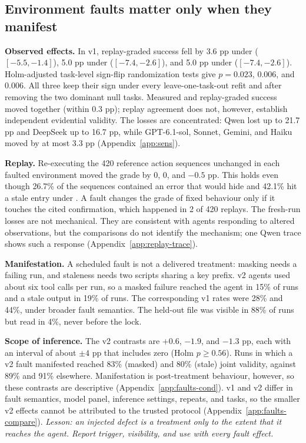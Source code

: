 \subsection{Environment faults matter only when they manifest}
\label{sec:env}
\textbf{Observed effects.} In v1, replay-graded success fell by 3.6 pp under
 ($[-5.5,-1.4]$), 5.0 pp under  ($[-7.4,-2.6]$), and
5.0 pp under  ($[-7.4,-2.6]$).
Holm-adjusted task-level sign-flip randomization tests give $p=0.023$,
$0.006$, and $0.006$. All three keep their sign under every leave-one-task-out
refit and after removing the two dominant null tasks. Measured and replay-graded success
moved together (within 0.3 pp); replay agreement does not, however,
establish independent evidential validity.
The losses are concentrated: Qwen lost up to 21.7 pp and DeepSeek up to
16.7 pp, while GPT-6.1-sol, Sonnet, Gemini, and Haiku moved by at most 3.3 pp
(Appendix~\ref{app:sens}).

\textbf{Replay.} Re-executing the 420 reference action sequences unchanged in
each faulted environment moved the grade by 0, 0, and $-0.5$ pp. This holds
even though 26.7\% of the sequences contained an error that 
would hide and 42.1\% hit a stale entry under . A fault changes the
grade of fixed behaviour only if it touches the cited confirmation, which
happened in 2 of 420 replays. The fresh-run losses are not mechanical. They are consistent with agents
responding to altered observations, but the comparisons do not identify the
mechanism; one Qwen trace shows such a response (Appendix~\ref{app:replay-trace}).

\textbf{Manifestation.} A scheduled fault is not a delivered treatment: masking
needs a failing run, and staleness needs two scripts sharing a key prefix. v2
agents used about six tool calls per run, so a masked failure reached the agent in 15\% of  runs and a
stale output in 19\% of  runs. The corresponding v1 rates
were 28\% and 44\%, under broader fault semantics. The held-out file was
visible in 88\% of  runs but read in 4\%, never before the
lock.

\textbf{Scope of inference.} The v2 contrasts are $+0.6$, $-1.9$, and $-1.3$
pp, each with an interval of about $\pm4$ pp that includes zero (Holm
$p\ge0.56$). Runs in
which a v2 fault manifested reached 83\% (masked) and 80\% (stale) joint
validity, against 89\% and 91\% elsewhere. Manifestation is post-treatment
behaviour, however, so these contrasts are descriptive (Appendix~\ref{app:faults-cond}).
v1 and v2 differ in fault semantics, model panel, inference settings,
repeats, and tasks, so the smaller v2 effects cannot be attributed to the
trusted protocol (Appendix~\ref{app:faults-compare}). \emph{Lesson: an injected
defect is a treatment only to the extent that it reaches the agent. Report
trigger, visibility, and use with every fault effect.}

